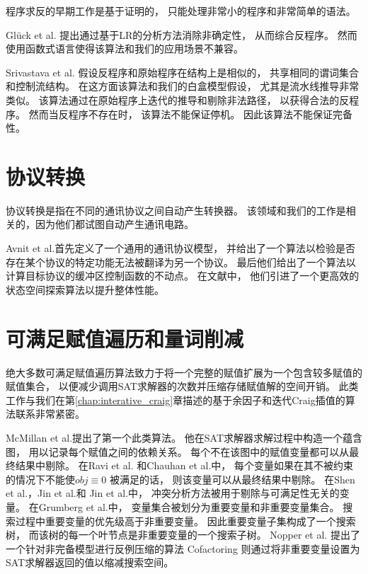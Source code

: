 程序求反的早期工作是基于证明的，
只能处理非常小的程序和非常简单的语法。

Gl\"{u}ck et al.  提出通过基于LR的分析方法消除非确定性，
从而综合反程序。
然而使用函数式语言使得该算法和我们的应用场景不兼容。

Srivastava et al. 假设反程序和原始程序在结构上是相似的，
共享相同的谓词集合和控制流结构。
在这方面该算法和我们的白盒模型假设，
尤其是流水线推导非常类似。
该算法通过在原始程序上迭代的推导和剔除非法路径，
以获得合法的反程序。
然而当反程序不存在时，
该算法不能保证停机。
因此该算法不能保证完备性。



\section{协议转换}
协议转换是指在不同的通讯协议之间自动产生转换器。
该领域和我们的工作是相关的，因为他们都试图自动产生通讯电路。

Avnit et al.首先定义了一个通用的通讯协议模型，
并给出了一个算法以检验是否存在某个协议的特定功能无法被翻译为另一个协议。
最后他们给出了一个算法以计算目标协议的缓冲区控制函数的不动点。
在文献中，
他们引进了一个更高效的状态空间探索算法以提升整体性能。

\section{可满足赋值遍历和量词削减}\label{subsec_relallsat}

绝大多数可满足赋值遍历算法致力于将一个完整的赋值扩展为一个包含较多赋值的赋值集合，
以便减少调用SAT求解器的次数并压缩存储赋值解的空间开销。
此类工作与我们在第\ref{chap:interative_craig}章描述的基于余因子和迭代Craig插值的算法联系非常紧密。

McMillan et al.提出了第一个此类算法。
他在SAT求解器求解过程中构造一个蕴含图，
用以记录每个赋值之间的依赖关系。
每个不在该图中的赋值变量都可以从最终结果中剔除。
在Ravi et al. 和Chauhan et al.中，
每个变量如果在其不被约束的情况下不能使$obj\equiv 0$ 被满足的话，
则该变量可以从最终结果中剔除。
在Shen et al.，Jin et al.和 Jin et al.中，
冲突分析方法被用于剔除与可满足性无关的变量。
在Grumberg et al.中，
变量集合被划分为重要变量和非重要变量集合。
搜索过程中重要变量的优先级高于非重要变量。
因此重要变量子集构成了一个搜索树，
而该树的每一个叶节点是非重要变量的一个搜索子树。
Nopper et al. 提出了一个针对非完备模型进行反例压缩的算法
Cofactoring  则通过将非重要变量设置为SAT求解器返回的值以缩减搜索空间。

